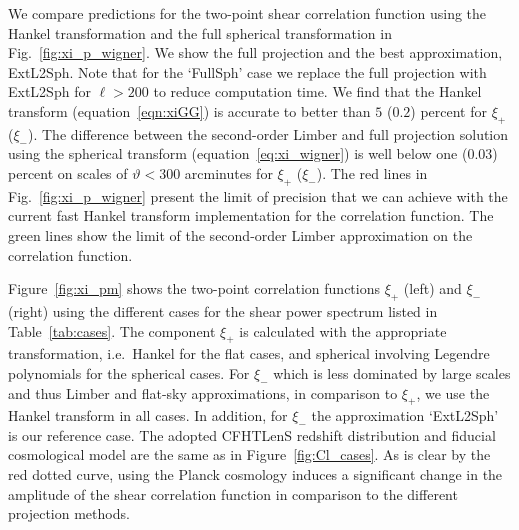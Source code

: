 \documentclass[fleqn,usenatbib]{mnras} %
\begin{document}
We compare predictions for the two-point shear correlation function using
the Hankel transformation and the full spherical transformation in
Fig.~\ref{fig:xi_p_wigner}. We show the full projection and the best
approximation, ExtL2Sph. Note that for the `FullSph' case we replace the full
projection with ExtL2Sph for $\ell > 200$ to reduce computation time.
%
We find that the Hankel transform (equation~\ref{eqn:xiGG}) is accurate to better than $5$ ($0.2$) percent
for $\xi_+$ ($\xi_-$).
%
The difference between the second-order Limber and full projection solution using the
spherical transform (equation~\ref{eq:xi_wigner}) is well below one ($0.03$) percent
on scales of $\vartheta < 300$ arcminutes for $\xi_+$ ($\xi_-$).
The red lines in Fig.~\ref{fig:xi_p_wigner} present the limit of
precision that we can achieve with the current fast Hankel transform implementation
for the correlation function. The green lines show the limit of the
second-order Limber approximation on the correlation function.

Figure~\ref{fig:xi_pm} shows the two-point correlation functions $\xi_+$ (left)
and $\xi_-$ (right) using the different cases for the shear power spectrum
listed in Table~\ref{tab:cases}. The component $\xi_+$ is calculated with the
appropriate transformation, i.e.~Hankel for the flat cases, and {spherical
involving Legendre polynomials} for the spherical cases. For $\xi_-$ which is
less dominated by large scales and thus Limber and flat-sky approximations, in
comparison to $\xi_+$, we use the Hankel transform in all cases. In addition,
for $\xi_-$ the approximation `ExtL2Sph' is our reference case. The adopted
CFHTLenS redshift distribution and fiducial cosmological model are the same as
in Figure~\ref{fig:Cl_cases}. As is clear by the red dotted curve, using the
Planck cosmology \citep{2015arXiv150201589P} induces a significant change in
the amplitude of the shear correlation function in comparison to the different
projection methods.
\end{document}
